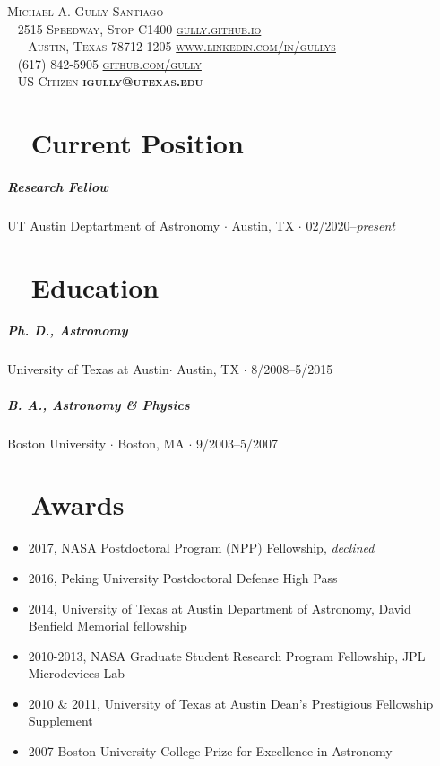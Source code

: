 \documentclass[10pt,letterpaper]{article}
\newcommand{\namestyle}{\Huge \scshape}
\newcommand{\addressstyle}{\color{addresscolor}  \footnotesize \sffamily \upshape}
\begin{document}
\begin{flushleft}
    \namestyle Michael A. Gully-Santiago \\[0.3em]
    \addressstyle
    \faMapMarker ~ 2515 Speedway, Stop C1400  \hfill \url{gully.github.io} ~ \faLink \\
    ~ ~ Austin, Texas 78712-1205  \hfill  \url{www.linkedin.com/in/gullys} ~ \faLinkedin \\
    \faPhone ~ (617) 842-5905 \hfill \url{github.com/gully} ~ \faGithub \\
    \faGlobe ~ US Citizen \hfill \textbf{igully@utexas.edu} ~ \faInbox\\

\end{flushleft}

\small

\section*{\faToggleOn ~ Current Position}

\subparagraph{Research Fellow}
UT Austin Deptartment of Astronomy $\cdot$ Austin, TX $\cdot$ 02/2020--\emph{present}

\section*{\faGraduationCap ~ Education}

\subparagraph{Ph. D., Astronomy}
University of Texas at Austin$\cdot$ Austin, TX $\cdot$ 8/2008--5/2015

\subparagraph{B. A., Astronomy \& Physics}
Boston University $\cdot$ Boston, MA $\cdot$ 9/2003--5/2007


\section*{\faTrophy ~ Awards}

\begin{itemize}
    \item 2017, NASA Postdoctoral Program (NPP) Fellowship,  \emph{declined}
    \item 2016, Peking University Postdoctoral Defense High Pass
    \item 2014, University of Texas at Austin Department of Astronomy, David Benfield Memorial fellowship
    \item 2010-2013, NASA Graduate Student Research Program Fellowship, JPL Microdevices Lab
    \item 2010 \& 2011, University of Texas at Austin Dean's Prestigious Fellowship Supplement
    \item 2007 Boston University College Prize for Excellence in Astronomy
\end{itemize}
\end{document}
